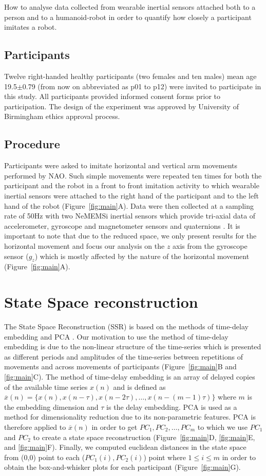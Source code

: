 \documentclass{sig-alternate-05-2015}
\begin{document}
How to analyse  data collected from wearable inertial sensors attached both 
to a person and to a humanoid-robot in order to quantify how closely a participant 
imitates a robot.


\subsection{Participants}
Twelve right-handed healthy participants (two females and ten males)
mean age 19.5$\pm$0.79 (from now on abbreviated as p01 to p12) were invited to 
participate in this study. 
All participants provided informed consent forms prior to participation.
The design of the experiment was approved by University of Birmingham ethics approval
process. 

 
\subsection{Procedure}
Participants were asked to imitate horizontal and vertical arm movements
performed by NAO.
Such simple movements were repeated ten times for both the participant and the robot
 in a front to front imitation activity
 to which
 wearable inertial sensors were attached to the right hand of the participant and to the left hand of the robot
(Figure~\ref{fig:main}A).
Data were then collected at a sampling rate of 50Hz with two NeMEMSi inertial sensors
which provide tri-axial data of accelerometer, gyroscope and magnetometer sensors and
quaternions \cite{Comotti2014}. 
It is important to note that due to the reduced space, we only present
results for the horizontal movement and focus our analysis on the $z$ axis from the gyroscope sensor ($g_z$) 
which is mostly affected by the nature of the horizontal movement (Figure~\ref{fig:main}A).


\section{State Space reconstruction}

The State Space Reconstruction (SSR) is based on the methods of time-delay embedding and PCA \cite{Gibson1992}.
Our motivation to use the method of time-delay embedding
is due to the non-linear structure of the time-series
which is 
presented 
as
different periods and amplitudes of the time-series 
between repetitions of movements and across movements of participants (Figure~\ref{fig:main}B and \ref{fig:main}C).
The method of time-delay embedding is an array of 
delayed copies of the available time series $x(n)$ and is defined as  
$ \overline{x}(n) = \{  x(n), x(n-\tau), x(n-2\tau), \dots,x(n-(m-1)\tau)\}$
where $m$ is the embedding dimension and $\tau$ is the delay embedding.
PCA is used as a method for dimensionality reduction due to its non-parametric features.
PCA is therefore applied to $ \overline{x}(n)$ in order to get $PC_1, PC_2, \dots, PC_m$ 
to which we use $PC_1$ and $PC_2$ 
to create a state space reconstruction (Figure~\ref{fig:main}D, \ref{fig:main}E, and \ref{fig:main}F).
Finally, we computed euclidean distances in the state space 
from (0,0) point to each ($PC_1(i),PC_2(i)$) point where $1 \leq i \leq m$
in order to obtain the box-and-whisker plots for each participant (Figure~\ref{fig:main}G).
\end{document}
